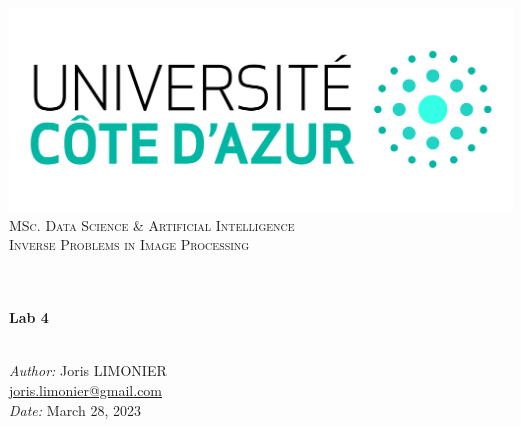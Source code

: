 \begin{titlepage}
	\begin{center}
		\includegraphics[width=\textwidth]{images/logo_uca.jpeg}\\[0.1cm]
		\vspace{1.5cm}
		\textsc{\Large MSc. Data Science \& Artificial Intelligence}\\[1.2cm]
		\textsc{\Large Inverse Problems in Image Processing}\\[1.2cm]
		\\
		\vspace{1cm}

		\HRule \\[0.6cm]
		{\huge \bfseries Lab 4}\\[0.3cm]
		\HRule \\[1.8cm]
		\vfill

		\large
		\emph{Author:} Joris LIMONIER\\[.2cm]
		\href{mailto:joris.limonier@gmail.com}{\color{black}joris.limonier@gmail.com} \\[.2cm]
		\emph{Date:} {\large March 28, 2023}
	\end{center}
\end{titlepage}


